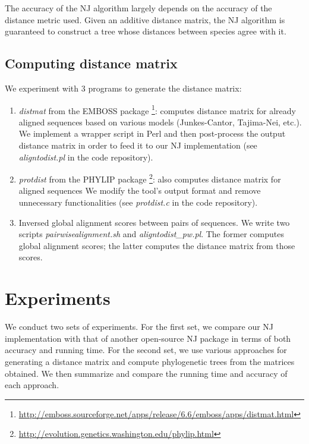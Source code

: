 \documentclass[11pt,letterpaper]{article}
\theoremstyle{definition}
\begin{document}
The accuracy of the NJ algorithm largely depends on the accuracy of the distance metric used. Given an additive distance matrix, the NJ algorithm is guaranteed to construct a tree whose distances between species agree with it. 

\subsection{Computing distance matrix}\label{distance}


We experiment with 3 programs to generate the distance matrix:
\begin{enumerate}
	\item \textit{distmat} from the EMBOSS package \cite{rice2000emboss}  \footnote{\url{http://emboss.sourceforge.net/apps/release/6.6/emboss/apps/distmat.html}}: computes distance matrix for already aligned sequences based on various models (Junkes-Cantor, Tajima-Nei, etc.). We implement a wrapper script in Perl and then post-process the output distance matrix in order to feed it to our NJ implementation (see \textit{aligntodist.pl} in the code repository).
        \item \textit{protdist} from the PHYLIP package \footnote{\url{http://evolution.genetics.washington.edu/phylip.html}}: also computes distance matrix for aligned sequences We modify the tool's output format and remove unnecessary functionalities (see \textit{protdist.c} in the code repository).
	\item Inversed global alignment scores between pairs of sequences. We write two scripts \textit{pairwisealignment.sh} and \textit{aligntodist\_pw.pl}. The former computes global alignment scores; the latter computes the distance matrix from those scores.
\end{enumerate}

\section{Experiments}

We conduct two sets of experiments. For the first set, we compare our NJ implementation with that of another open-source NJ package in terms of both accuracy and running time. For the second set, we use various approaches for generating a distance matrix and compute phylogenetic trees from the matrices obtained. We then summarize and compare the running time and accuracy of each approach. 
\end{document}
